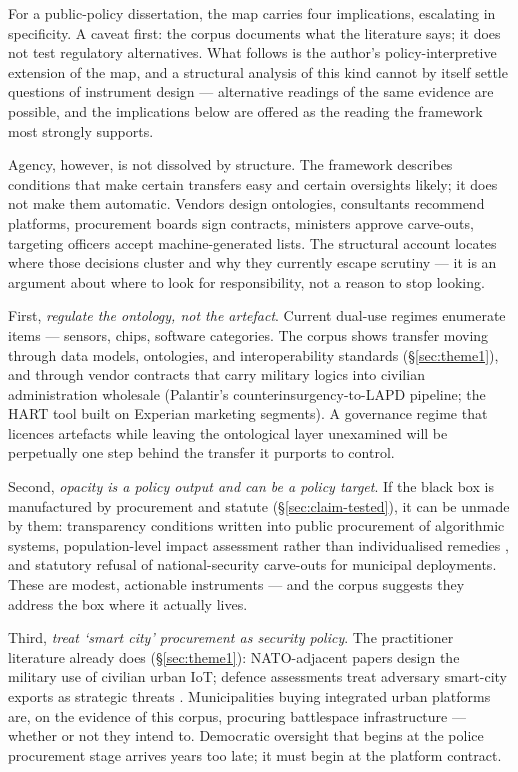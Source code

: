 For a public-policy dissertation, the map carries four implications, escalating in specificity. A caveat first: the corpus documents what the literature says; it does not test regulatory alternatives. What follows is the author's policy-interpretive extension of the map, and a structural analysis of this kind cannot by itself settle questions of instrument design — alternative readings of the same evidence are possible, and the implications below are offered as the reading the framework most strongly supports.

Agency, however, is not dissolved by structure. The framework describes conditions that make certain transfers easy and certain oversights likely; it does not make them automatic. Vendors design ontologies, consultants recommend platforms, procurement boards sign contracts, ministers approve carve-outs, targeting officers accept machine-generated lists. The structural account locates where those decisions cluster and why they currently escape scrutiny — it is an argument about where to look for responsibility, not a reason to stop looking.

First, \textit{regulate the ontology, not the artefact}. Current dual-use regimes enumerate items — sensors, chips, software categories. The corpus shows transfer moving through data models, ontologies, and interoperability standards (§\ref{sec:theme1}), and through vendor contracts that carry military logics into civilian administration wholesale (Palantir's counterinsurgency-to-LAPD pipeline; the HART tool built on Experian marketing segments). A governance regime that licences artefacts while leaving the ontological layer unexamined will be perpetually one step behind the transfer it purports to control.

Second, \textit{opacity is a policy output and can be a policy target}. If the black box is manufactured by procurement and statute (§\ref{sec:claim-tested}), it can be unmade by them: transparency conditions written into public procurement of algorithmic systems, population-level impact assessment rather than individualised remedies \parencite{erdogan2024}, and statutory refusal of national-security carve-outs for municipal deployments. These are modest, actionable instruments — and the corpus suggests they address the box where it actually lives.

Third, \textit{treat `smart city' procurement as security policy}. The practitioner literature already does (§\ref{sec:theme1}): NATO-adjacent papers design the military use of civilian urban IoT; defence assessments treat adversary smart-city exports as strategic threats \parencite{atha2020,weber2023}. Municipalities buying integrated urban platforms are, on the evidence of this corpus, procuring battlespace infrastructure — whether or not they intend to. Democratic oversight that begins at the police procurement stage arrives years too late; it must begin at the platform contract.

